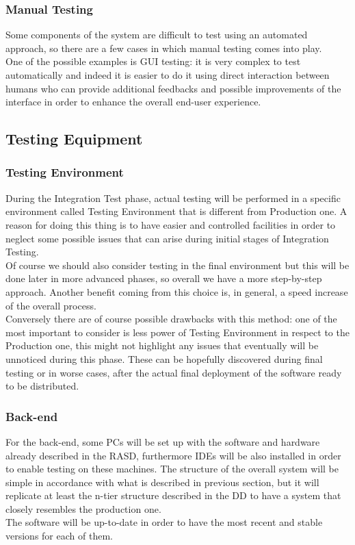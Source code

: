 \subsubsection{Manual Testing}
Some components of the system are difficult to test using an automated approach, so there are a few cases in which manual testing comes into play. \\ One of the possible examples is GUI testing: it is very complex to test automatically and indeed it is easier to do it using direct interaction between humans who can provide additional feedbacks and possible improvements of the interface in order to enhance the overall end-user experience. 

\subsection{Testing Equipment}

\subsubsection{Testing Environment}
During the Integration Test phase, actual testing will be performed in a specific environment called Testing Environment that is different from Production one. A reason for doing this thing is to have easier and controlled facilities in order to neglect some possible issues that can arise during initial stages of Integration Testing. \\ Of course we should also consider testing in the final environment but this will be done later in more advanced phases, so overall we have a more step-by-step approach. Another benefit coming from this choice is, in general, a speed increase of the overall process. \\ Conversely there are of course possible drawbacks with this method: one of the most important to consider is less power of Testing Environment in respect to the Production one, this might not highlight any issues that eventually will be unnoticed during this phase. These can be hopefully discovered during final testing or in worse cases, after the actual final deployment of the software ready to be distributed.  

\subsubsection{Back-end}
For the back-end, some PCs will be set up with the software and hardware already described in the RASD, furthermore IDEs will be also installed in order to enable testing on these machines. The structure of the overall system will be simple in accordance with what is described in previous section, but it will replicate at least the n-tier structure described in the DD to have a system that closely resembles the production one. \\ The software will be up-to-date in order to have the most recent and stable versions for each of them.


